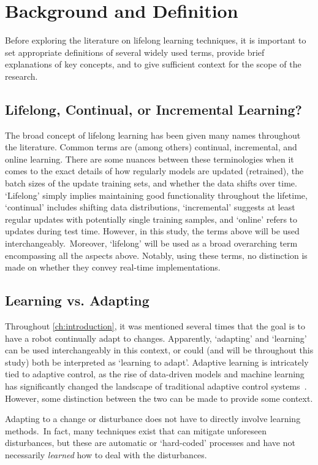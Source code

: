 \chapter{Background and Definition}\label{ch:background}
Before exploring the literature on lifelong learning techniques, it is important to set appropriate definitions of several widely used terms, provide brief explanations of key concepts, and to give sufficient context for the scope of the research.


\section{Lifelong, Continual, or Incremental Learning?}\label{sec:lifelong-def}
The broad concept of lifelong learning has been given many names throughout the literature.
Common terms are (among others) continual, incremental, and online learning.
There are some nuances between these terminologies when it comes to the exact details of how regularly models are updated (retrained), the batch sizes of the update training sets, and whether the data shifts over time.
`Lifelong' simply implies maintaining good functionality throughout the lifetime, `continual' includes shifting data distributions, `incremental' suggests at least regular updates with potentially single training samples, and `online' refers to updates during test time.
However, in this study, the terms above will be used interchangeably.\ Moreover, `lifelong' will be used as a broad overarching term encompassing all the aspects above.
Notably, using these terms, no distinction is made on whether they convey real-time implementations.


\section{Learning vs. Adapting}\label{sec:learning-v-adapting}
Throughout \cref{ch:introduction}, it was mentioned several times that the goal is to have a robot continually
adapt to changes.
Apparently, `adapting' and `learning' can be used interchangeably in this context, or could (and will be throughout this study) both be interpreted as `learning to adapt'.
Adaptive learning is intricately tied to adaptive control, as the rise of data-driven models and machine learning has significantly changed the landscape of traditional adaptive control systems~\cite{Annaswamy2021}.
However, some distinction between the two can be made to provide some context.

Adapting to a change or disturbance does not have to directly involve learning methods.\ In fact, many techniques exist that can mitigate unforeseen disturbances, but these are automatic or `hard-coded' processes and have not necessarily \emph{learned} how to deal with the disturbances.

